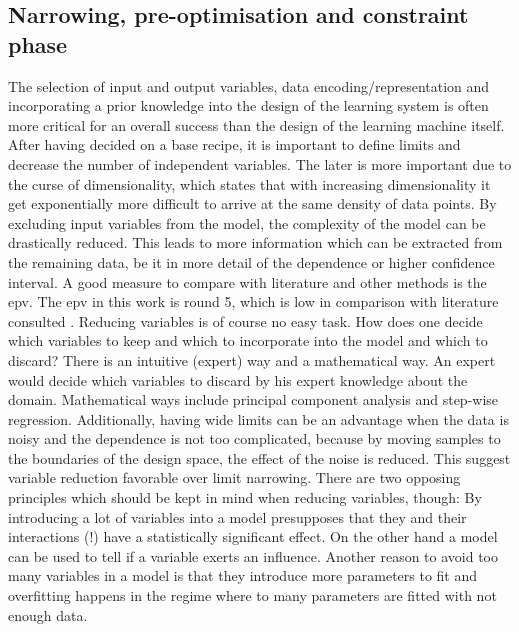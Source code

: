\subsection{Narrowing, pre-optimisation and constraint phase}
\label{sec:phase2}
The selection of input and output variables, data encoding/representation and incorporating a prior knowledge into the design of the learning system is often more critical for an overall success than the design of the learning machine itself.\cite{cherkassky1998learning} %
After having decided on a base recipe, it is important to define limits and decrease the number of independent variables. 
The later is more important due to the curse of dimensionality\cite{cherkassky1998learning}, 
which states that with increasing dimensionality it get exponentially more difficult to arrive at the same density of data points. 
By excluding input variables from the model, 
the complexity of the model can be drastically reduced. 
This leads to more information which can be extracted from the remaining data, 
be it in more detail of the dependence or higher confidence interval. 
A good measure to compare with literature and other methods is the \gls{epv}. 
The \gls{epv} in this work is round 5,
which is low in comparison with literature consulted
\cite{
ahmed2017preparation,
fernandes2010multi,
kaczmarowski2015genetic,
mahdavi2017hardness,
soltanali2014neural,
panwar2014design,
schubert2008design,
shanaghi2013experimental}.
Reducing variables is of course no easy task.
How does one decide which variables to keep and which to incorporate into the model and which to discard? 
There is an intuitive (expert) way and a mathematical way.
An expert would decide which variables to discard by his expert knowledge about the domain. 
Mathematical ways include principal component analysis and step-wise regression.
%
Additionally, having wide limits can be an advantage when the data is noisy and the dependence is not too complicated, because by moving samples to the boundaries of the design space, the effect of the noise is reduced\cite{giunta2003overview}. 
This suggest variable reduction favorable over limit narrowing.
%
There are two opposing principles which should be kept in mind when reducing variables, though:
By introducing a lot of variables into a model presupposes that they and their interactions (!) have a statistically significant effect\cite{gunst2009fractional}.
On the other hand a model can be used to tell if a variable exerts an influence\cite{haertler2014statistisch}. 
%
Another reason to avoid too many variables in a model is that they introduce more parameters to fit and overfitting happens in the regime where to many parameters are fitted with not enough data.

